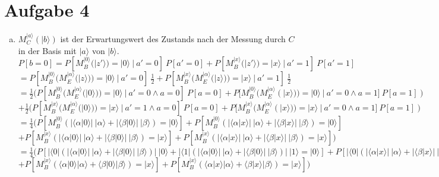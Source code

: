\documentclass[a4paper]{scrartcl}
\begin{document}
\newpage
\section*{Aufgabe 4}
\begin{enumerate}[a)]

\item $M_C^{|a\rangle}(|b\rangle)$ ist der Erwartungswert des Zustands nach der Messung durch $C$ in der Basis mit $|a\rangle$ von $|b\rangle$.\\

$P[b=0] = P[M_B^{|0\rangle}(|z'\rangle)=|0\rangle~|~a'=0]~P[a'=0] + P[M_B^{|x\rangle}(|z'\rangle)=|x\rangle~|~a'=1]~P[a'=1]$\\
$=P[M_B^{|0\rangle}(M_E^{|\alpha \rangle}(|z\rangle))=|0\rangle~|~a'=0]~\frac{1}{2} + P[M_B^{|x\rangle}(M_E^{|\alpha \rangle}(|z\rangle))=|x\rangle~|~a'=1]~\frac{1}{2}$\\
$=\frac{1}{2} (P[M_B^{|0\rangle}(M_E^{|\alpha \rangle}(|0\rangle))=|0\rangle~|~a'=0 \wedge a=0]~P[a=0] + P[M_B^{|0\rangle}(M_E^{|\alpha \rangle}(|x\rangle))=|0\rangle~|~a'=0 \wedge a=1]~P[a=1])$\\
$+\frac{1}{2} (P[M_B^{|x\rangle}(M_E^{|\alpha \rangle}(|0\rangle))=|x\rangle~|~a'=1 \wedge a=0]~P[a=0] + P[M_B^{|x\rangle}(M_E^{|\alpha \rangle}(|x\rangle))=|x\rangle~|~a'=0 \wedge a=1]~P[a=1])$\\
$=\frac{1}{4} (P[M_B^{|0\rangle}(|\langle \alpha|0\rangle|~|\alpha\rangle + |\langle \beta|0\rangle|~|\beta\rangle)=|0\rangle] + P[M_B^{|0\rangle}(|\langle \alpha|x\rangle|~|\alpha\rangle + |\langle \beta|x\rangle|~|\beta\rangle)=|0\rangle]$\\
$+ P[M_B^{|x\rangle}(|\langle \alpha|0\rangle|~|\alpha\rangle + |\langle \beta|0\rangle|~|\beta\rangle)=|x\rangle] + P[M_B^{|x\rangle}(|\langle \alpha|x\rangle|~|\alpha\rangle + |\langle \beta|x\rangle|~|\beta\rangle)=|x\rangle])$\\
$=\frac{1}{4} (P[|\langle 0|(|\langle \alpha|0\rangle|~|\alpha\rangle + |\langle \beta|0\rangle|~|\beta\rangle)|~|0\rangle + |\langle 1|(|\langle \alpha|0\rangle|~|\alpha\rangle + |\langle \beta|0\rangle|~|\beta\rangle)|~|1\rangle=|0\rangle] + P[|\langle 0|(|\langle \alpha|x\rangle|~|\alpha\rangle + |\langle \beta|x\rangle|~|\beta\rangle)|~|0\rangle + |\langle 1|(|\langle \alpha|x\rangle|~|\alpha\rangle + |\langle \beta|x\rangle|~|\beta\rangle)|~|1\rangle =|0\rangle]$\\
$+ P[M_B^{|x\rangle}(\langle \alpha|0\rangle |\alpha\rangle + \langle \beta|0\rangle |\beta\rangle)=|x\rangle] + P[M_B^{|x\rangle}(\langle \alpha|x\rangle |\alpha\rangle + \langle \beta|x\rangle |\beta\rangle)=|x\rangle])$\\


\end{enumerate}
\end{document}
